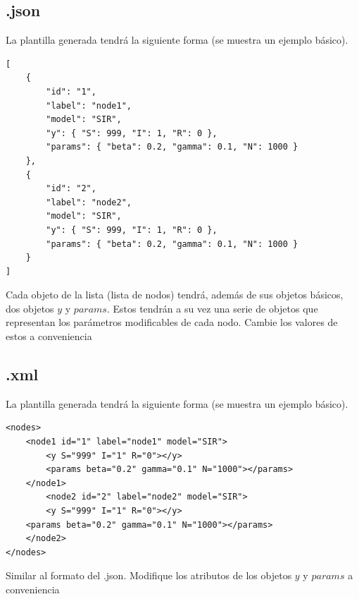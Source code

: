 \documentclass[a4paper,12pt]{article}
\begin{document}
\subsection*{.json}
La plantilla generada tendrá la siguiente forma (se muestra un ejemplo básico).

\begin{lstlisting}
[
	{
		"id": "1",
		"label": "node1",
		"model": "SIR",
		"y": { "S": 999, "I": 1, "R": 0 },
		"params": { "beta": 0.2, "gamma": 0.1, "N": 1000 }
	},
	{
		"id": "2",
		"label": "node2",
		"model": "SIR",
		"y": { "S": 999, "I": 1, "R": 0 },
		"params": { "beta": 0.2, "gamma": 0.1, "N": 1000 }
	}
]
\end{lstlisting}
Cada objeto de la lista (lista de nodos) tendrá, además de sus objetos básicos, dos objetos $y$ y $params$. Estos tendrán a su vez una serie de objetos que representan los parámetros modificables de cada nodo. Cambie los valores de estos a conveniencia

\subsection*{.xml}
La plantilla generada tendrá la siguiente forma (se muestra un ejemplo básico).
\begin{lstlisting}
<nodes>
	<node1 id="1" label="node1" model="SIR">
		<y S="999" I="1" R="0"></y>
		<params beta="0.2" gamma="0.1" N="1000"></params>
	</node1>
		<node2 id="2" label="node2" model="SIR">
		<y S="999" I="1" R="0"></y>
	<params beta="0.2" gamma="0.1" N="1000"></params>
	</node2>
</nodes>
\end{lstlisting}
Similar al formato del .json. Modifique los atributos de los objetos $y$ y $params$ a conveniencia
\end{document}
